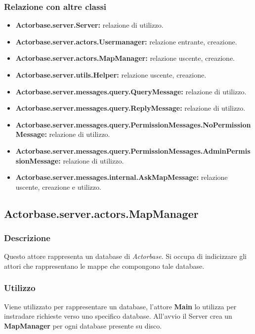 \documentclass[a4paper]{article}
\begin{document}
			\subsubsection{Relazione con altre classi}
				\begin{itemize}
					\item \textbf{Actorbase.server.Server:} relazione di utilizzo.
					\item \textbf{Actorbase.server.actors.Usermanager:} relazione entrante, creazione.
					\item \textbf{Actorbase.server.actors.MapManager:} relazione uscente, creazione.
					\item \textbf{Actorbase.server.utils.Helper:} relazione uscente, creazione.
					\item \textbf{Actorbase.server.messages.query.QueryMessage:} relazione di utilizzo.
					\item \textbf{Actorbase.server.messages.query.ReplyMessage:} relazione di utilizzo.
					\item \textbf{Actorbase.server.messages.query.PermissionMessages.NoPermissionMessage:} relazione di utilizzo.
					\item \textbf{Actorbase.server.messages.query.PermissionMessages.AdminPermissionMessage:} relazione di utilizzo.
					\item \textbf{Actorbase.server.messages.internal.AskMapMessage:} relazione uscente, creazione e utilizzo.
				\end{itemize}
				
		\subsection{Actorbase.server.actors.MapManager}
			\subsubsection{Descrizione}
				Questo attore rappresenta un database di \emph{Actorbase}. Si occupa di indicizzare gli attori che rappresentano le mappe che compongono tale database.
				
			\subsubsection{Utilizzo}
				Viene utilizzato per rappresentare un database, l'attore \textbf{Main} lo utilizza per instradare richieste verso uno specifico database. All'avvio il Server crea un \textbf{MapManager} per ogni database presente su disco.
				
\end{document}

